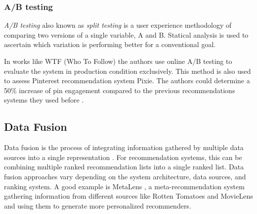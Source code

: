 \subsubsection{A/B testing}
\label{subsubsec:ab-testing}
\emph{A/B testing} also known as \emph{split testing} is a user experience methodology of comparing two versions of a single variable, A and B. Statical analysis is used to ascertain which variation is performing better for a conventional goal.

In works like WTF (Who To Follow) \cite{gupta2013wtf} the authors use online A/B testing to evaluate the system in production condition exclusively. This method is also used to assess Pinterest recommendation system Pixie. The authors could determine a 50\% increase of pin engagement compared to the previous recommendations systems they used before \cite{eksombatchai2018pixie}.


\subsection{Data Fusion}
Data fusion is the process of integrating information gathered by multiple data sources into a single representation \cite{hsu2005comparing}. For recommendation systems, this can be combining multiple ranked recommendation lists into a single ranked list. Data fusion approaches vary depending on the system architecture, data sources, and ranking system. A good example is MetaLens \cite{schafer2002meta}, a meta-recommendation system gathering information from different sources like Rotten Tomatoes and MovieLens and using them to generate more personalized recommenders.


 \cite{wu2006performance}

